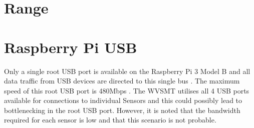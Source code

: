 \section{Range}


\section{Raspberry Pi USB}

Only a single root USB port is available on the Raspberry Pi 3 Model B and all data traffic from USB devices are directed to this single bus \cite{rpi3hardware}. The maximum speed of this root USB port is 480Mbps \cite{rpi3faqs}. The WVSMT utilises all 4 USB ports available for connections to individual Sensors and this could possibly lead to bottlenecking in the root USB port. However, it is noted that the bandwidth required for each sensor is low and that this scenario is not probable. 